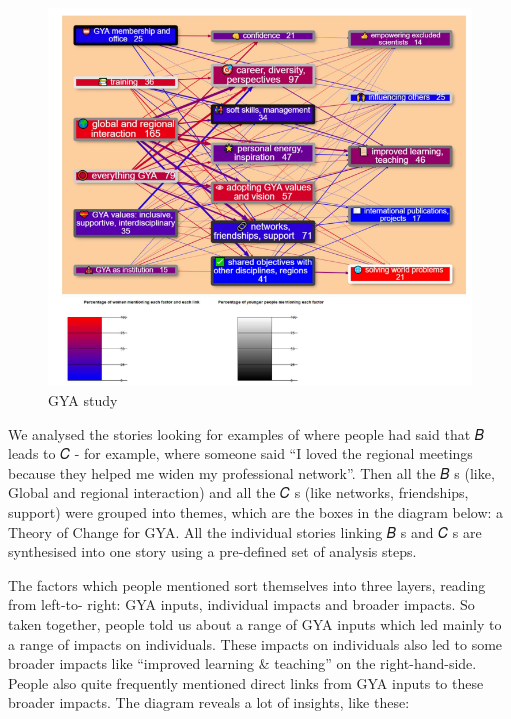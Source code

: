 \documentclass[
]{book}
\begin{document}
\begin{figure}
\centering
\includegraphics{_assets/a5fe43e040d834d29f87af7e2dc8daa9.png}
\caption{GYA study}
\end{figure}

We analysed the stories looking for examples of where people had said that 𝐵 leads to 𝐶 -
for example, where someone said ``I loved the regional meetings because they helped me
widen my professional network''. Then all the 𝐵 s (like, Global and regional interaction) and
all the 𝐶 s (like networks, friendships, support) were grouped into themes, which are the
boxes in the diagram below: a Theory of Change for GYA. All the individual stories linking 𝐵 s and 𝐶 s are synthesised into one story using a pre-defined set of analysis steps.

The factors which people mentioned sort themselves into three layers, reading from left-to-
right: GYA inputs, individual impacts and broader impacts. So taken together, people told
us about a range of GYA inputs which led mainly to a range of impacts on individuals. These
impacts on individuals also led to some broader impacts like ``improved learning \&
teaching'' on the right-hand-side. People also quite frequently mentioned direct links from
GYA inputs to these broader impacts. The diagram reveals a lot of insights, like these:
\end{document}
